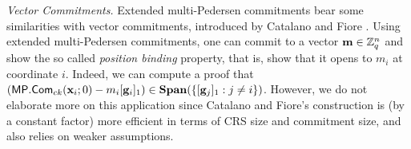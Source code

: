 \emph{Vector Commitments.} Extended multi-Pedersen commitments bear some similarities with vector commitments, introduced by Catalano and Fiore \cite{PKC:CatFio13}. Using extended multi-Pedersen commitments, one can commit to a vector $\mathbf{m}\in\mathbb{Z}_q^n$  and show the so called \emph{position binding} property, that is, show that it opens to $m_i$ at coordinate $i$. Indeed, we can compute a proof that $(\mathsf{MP}.\mathsf{Com}_{ck}(\mathbf{x}_i;0)-m_i[\mathbf{g}_i]_1)\in\mathbf{Span}(\{[\mathbf{g}_j]_1:j\neq i\})$. However, we do not elaborate more on this application since Catalano and     Fiore's construction is (by a constant factor) more efficient in terms of CRS size and commitment size, and also relies on weaker assumptions.



